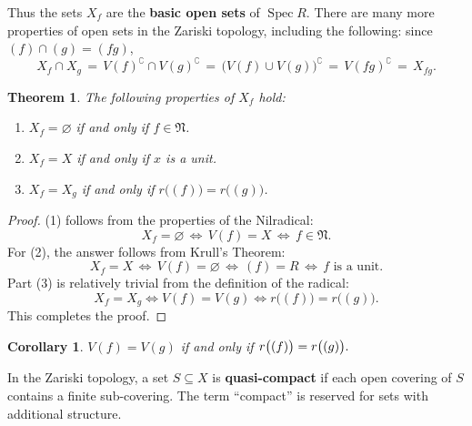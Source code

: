 \documentclass[11pt]{article}
\newtheorem{theorem}{Theorem}
\newtheorem{corollary}{Corollary}
\newcommand{\Spec}{\operatorname{Spec}}
\begin{document}
Thus the sets $X_{f}$ are the \textbf{basic open sets} of $\Spec R$. There are many more properties of open sets in the Zariski topology, including the following: since $(f) \cap (g) = (fg)$,
\[
  X_{f} \cap X_{g} \, = \, V(f)^{\complement} \cap V(g)^{\complement} \, = \, \big( V(f) \cup V(g) \big)^{\complement} \, = \, V(fg)^{\complement} \, = \, X_{fg}.
\]
\begin{adjustwidth}{0.5cm}{}
  \begin{theorem}
    The following properties of $X_{f}$ hold:
    \begin{enumerate}
      \item $X_{f} = \varnothing$ if and only if $f \in \mathfrak{N}$.
      \item $X_{f} = X$ if and only if $x$ is a unit.
      \item $X_{f} = X_{g}$ if and only if $r \big( (f) \big) = r \big( (g) \big)$.
    \end{enumerate}
  \end{theorem}
  \begin{proof}
    (1) follows from the properties of the Nilradical:
    \[
      X_{f} = \varnothing \, \iff \, V(f) = X \, \iff \, f \in \mathfrak{N}.
    \]
    For (2), the answer follows from Krull's Theorem:
    \[
      X_{f} = X \, \iff \, V(f) = \varnothing \, \iff \, (f) = R \, \iff \, f \text{ is a unit}.
    \]
    Part (3) is relatively trivial from the definition of the radical:
    \[
      X_{f} = X_{g} \iff V(f) = V(g) \iff r \big( (f) \big) = r \big( (g) \big).
    \]
    This completes the proof. 
  \end{proof}
  \begin{corollary}
    $V(f) = V(g)$ if and only if $r \big( (f) \big) = r \big( (g) \big). \\ \text{ }$  
  \end{corollary}
\end{adjustwidth}

In the Zariski topology, a set $S \subseteq X$ is \textbf{quasi-compact} if each open covering of $S$ contains a finite sub-covering. The term ``compact'' is reserved for sets with additional structure.
\end{document}
